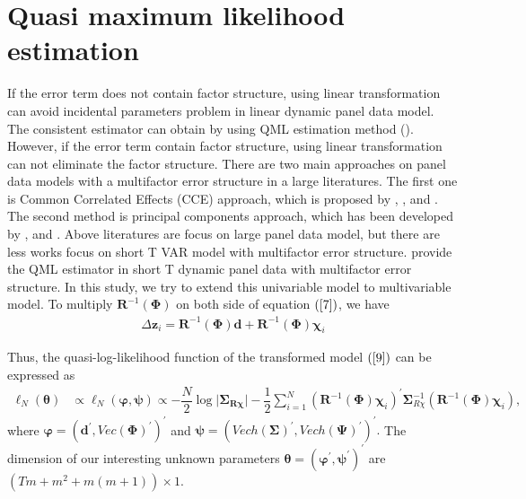 \documentclass[12pt,a4paper,hyperref]{article}
\begin{document}
\section{Quasi maximum likelihood estimation}
If the error term does not contain factor structure, using linear transformation can avoid incidental parameters problem in linear dynamic panel data model. The consistent estimator can obtain by using QML estimation method (\citet{Hsiao:2002}). However, if the error term contain factor structure, using linear transformation can not eliminate the factor structure.
There are two main approaches on panel data models with a multifactor error structure in a large literatures. The first one is  Common Correlated Effects (CCE) approach, which is proposed by \citet{Pesaran:2006}, \citet{Kapetanios:2011}, \citet{Chudik:2011} and \citet{Chudik:2015}. The second method is principal components approach, which has been developed by \citet{Bai:2002}, \citet{Bai:2009} and \citet{Moon:2015}.
Above literatures are focus on large panel data model, but there are less works focus on short T VAR model with multifactor error structure.
\cite{Hayakawa:2018} provide the QML estimator in short T dynamic panel data with multifactor error structure.  In this study, we try to extend this univariable model to multivariable model.
To multiply $\boldsymbol{R}^{-1}(\boldsymbol{\Phi})$ on both side of equation $\left(\ref{7} \right)$, we have
\begin{align}
\Delta \boldsymbol{z}_{i}=\boldsymbol{R}^{-1}(\boldsymbol{\Phi})\boldsymbol{d}+\boldsymbol{R} ^{-1}(\boldsymbol{\Phi})\boldsymbol{\chi}_{i} \label{9}
\end{align}


Thus, the quasi-log-likelihood function of the transformed model $(\ref{9})$ can be expressed as
\begin{align}
\ell_{N}\left(\boldsymbol{\theta}\right)&\propto \ell_{N}\left(  \boldsymbol{\varphi}, \boldsymbol{\psi} \right)\propto-\dfrac{N}{2}\log\vert  \boldsymbol{\Sigma_{R \chi}}\vert-\dfrac{1}{2}\sum^{N}_{i=1}\left( \boldsymbol{R}^{-1}(\boldsymbol{\Phi})\boldsymbol{\chi}_{i}\right)^{'}\boldsymbol{\Sigma}_{R \chi}^{-1}\left( \boldsymbol{R}^{-1}(\boldsymbol{\Phi}) \boldsymbol{\chi}_{i}\right), \label{10}
\end{align}
where  $\boldsymbol{\varphi}=\left(\boldsymbol{d}^{'} ,Vec(\boldsymbol{\Phi})^{'}\right)^{'}$ and $ \boldsymbol{\psi}=\left(Vech(\boldsymbol{\Sigma})^{'}, Vech(\boldsymbol{\Psi})^{'} \right)^{'}.$ The dimension of our interesting unknown parameters $\boldsymbol{\theta}=\left(\boldsymbol{\varphi}^{'}, \boldsymbol{\psi}^{'} \right)^{'}$ are $\left( Tm+m^{2}+m(m+1) \right) \times 1$.
\end{document}
